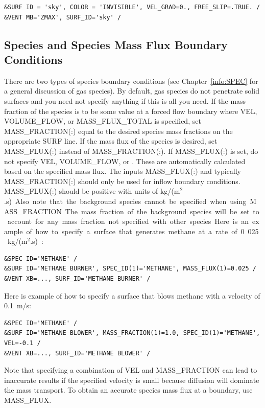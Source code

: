 \documentclass[11pt]{book}
\begin{document}
\begin{lstlisting}
&SURF ID = 'sky', COLOR = 'INVISIBLE', VEL_GRAD=0., FREE_SLIP=.TRUE. /
&VENT MB='ZMAX', SURF_ID='sky' /
\end{lstlisting}


\subsection{Species and Species Mass Flux Boundary Conditions}
\label{info:MASS_FLUX}

There are two types of species boundary conditions (see Chapter~\ref{info:SPEC} for a general discussion of gas species). By default, gas species do not penetrate solid surfaces and you need not specify anything if this is all you need. If the mass fraction of the species is to be some value at a forced flow boundary where {\ct VEL}, {\ct VOLUME\_FLOW}, or {\ct MASS\_FLUX\_TOTAL} is specified, set {\ct MASS\_FRACTION(:)} equal to the desired species mass fractions on the appropriate {\ct SURF} line. If the mass flux of the species is desired, set {\ct MASS\_FLUX(:)} instead of {\ct MASS\_FRACTION(:)}. If {\ct MASS\_FLUX(:)} is set, do not specify {\ct VEL}, {\ct VOLUME\_FLOW}, or . These are automatically calculated based on the specified mass flux. The inputs {\ct MASS\_FLUX(:)} and typically {\ct MASS\_FRACTION(:)} should only be used for inflow boundary conditions.  {\ct MASS\_FLUX(:)} should be positive with units of \si{kg/(m$^2$.s)}. Also note that the background species cannot be specified when using {\ct MASS\_FRACTION}.  The mass fraction of the background species will be set to account for any mass fraction not specified with other species.

Here is an example of how to specify a surface that generates methane at a rate of 0.025~\si{kg/(m$^2$.s)}:
\begin{lstlisting}
&SPEC ID='METHANE' /
&SURF ID='METHANE BURNER', SPEC_ID(1)='METHANE', MASS_FLUX(1)=0.025 /
&VENT XB=..., SURF_ID='METHANE BURNER' /
\end{lstlisting}
Here is example of how to specify a surface that blows methane with a velocity of 0.1~m/s:
\begin{lstlisting}
&SPEC ID='METHANE' /
&SURF ID='METHANE BLOWER', MASS_FRACTION(1)=1.0, SPEC_ID(1)='METHANE', VEL=-0.1 /
&VENT XB=..., SURF_ID='METHANE BLOWER' /
\end{lstlisting}
Note that specifying a combination of {\ct VEL} and {\ct MASS\_FRACTION} can lead to inaccurate results if the specified velocity is small because diffusion will dominate the mass transport.  To obtain an accurate species mass flux at a boundary, use {\ct MASS\_FLUX}.
\end{document}
